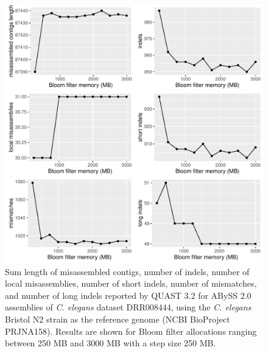 \documentclass[
  12pt,
  oneside,
  openany]{book}
\begin{document}
\begin{appendices}
\begin{figure}
\hypertarget{fig:fpr2}{%
\centering
\includegraphics{abyss2-appendix/quast-b.pdf}
\caption[Sum length of misassembled contigs, number of indels, number of local misassemblies, number of short indels, number of mismatches, and number of long indels reported by QUAST 3.2 for ABySS 2.0 assemblies of \emph{C. elegans} dataset DRR008444, using the \emph{C. elegans} Bristol N2 strain as the reference genome (NCBI BioProject PRJNA158).]{Sum length of misassembled contigs, number of indels, number of local misassemblies, number of short indels, number of mismatches, and number of long indels reported by QUAST 3.2 for ABySS 2.0 assemblies of \emph{C. elegans} dataset DRR008444, using the \emph{C. elegans} Bristol N2 strain as the reference genome (NCBI BioProject PRJNA158). Results are shown for Bloom filter allocations ranging between 250 MB and 3000 MB with a step size 250 MB.}\label{fig:fpr2}
}
\end{figure}


\end{appendices}
\end{document}
